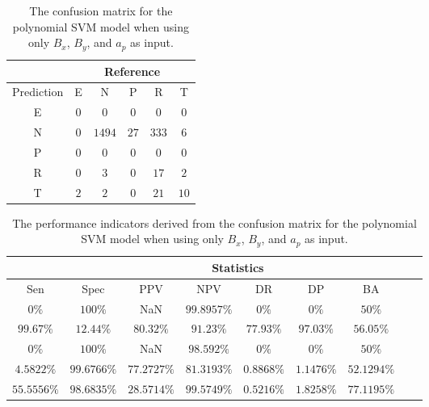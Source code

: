 \begin{table}[!ht]
	\centering
	\begin{tabular}{|c|c|c|c|c|c|}
		\hline
		 & \multicolumn{5}{|c|}{Reference} \\ \hline
		 Prediction & E & N & P & R & T \\ \hline
		 E & $0$ & $0$ & $0$ & $0$ & $0$ \\ \hline
		 N & $0$ & $1494$ & $27$ & $333$ & $6$ \\ \hline
		 P & $0$ & $0$ & $0$ & $0$ & $0$ \\ \hline
		 R & $0$ & $3$ & $0$ & $17$ & $2$ \\ \hline
		 T & $2$ & $2$ & $0$ & $21$ & $10$ \\ \hline
	\end{tabular}
	\caption{The confusion matrix for the polynomial SVM model when using only $B_{x}$, $B_{y}$, and $a_{p}$ as input.}
	\label{tab:cm:xyap:svmPoly}
\end{table}

\begin{table}[!ht]
	\centering
	\begin{tabular}{|c|c|c|c|c|c|c|c|c|}
		\hline
		 & \multicolumn{7}{c|}{Statistics} \\ \hline
		Sen & Spec & PPV & NPV & DR & DP & BA \\ \hline
		$0\%$ & $100\%$ & NaN & $99.8957\%$ & $0\%$ & $0\%$ & $50\%$ \\ \hline
		$99.67\%$ & $12.44\%$ & $80.32\%$ & $91.23\%$ & $77.93\%$ & $97.03\%$ & $56.05\%$ \\ \hline
		$0\%$ & $100\%$ & NaN & $98.592\%$ & $0\%$ & $0\%$ & $50\%$ \\ \hline
		$4.5822\%$ & $99.6766\%$ & $77.2727\%$ & $81.3193\%$ & $0.8868\%$ & $1.1476\%$ & $52.1294\%$ \\ \hline
		$55.5556\%$ & $98.6835\%$ & $28.5714\%$ & $99.5749\%$ & $0.5216\%$ & $1.8258\%$ & $77.1195\%$ \\ \hline
	\end{tabular}
	\caption{The performance indicators derived from the confusion matrix for the polynomial SVM model when using only $B_{x}$, $B_{y}$, and $a_{p}$ as input.}
	\label{tab:cs:xyap:svmPoly}
\end{table}

